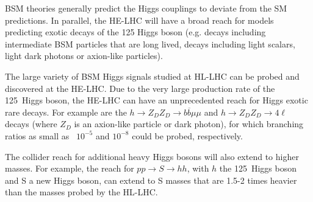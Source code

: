 \documentclass[../report.tex]{subfiles}
\begin{document}
BSM theories generally predict the Higgs couplings to deviate from the SM predictions. In parallel, the HE-LHC will have a broad reach for models predicting exotic decays of the 125 \UGeV Higgs boson (e.g. decays including intermediate BSM particles that are long lived, decays including light scalars, light dark photons or axion-like particles). 

The large variety of BSM Higgs signals studied at HL-LHC can be probed and discovered at the HE-LHC. Due to the very large production rate of the 125~\UGeV Higgs boson, the HE-LHC can have an unprecedented reach for Higgs exotic rare decays. For example are the $h \rightarrow Z_D Z_D \rightarrow b\overline{b}\mu\mu$ and $h \rightarrow  Z_D Z_D \rightarrow 4\ell$ decays (where $Z_D$ is an axion-like particle or dark photon), for which branching ratios as small as ~$10^{-5}$ and $10^{-8}$ could be probed, respectively.

The collider reach for additional heavy Higgs bosons will also extend to higher masses. For example, the reach for $pp \rightarrow S \rightarrow hh$, with $h$ the 125~\UGeV Higgs boson and S a new Higgs boson, can extend to S masses that are 1.5-2 times heavier than the masses probed by the HL-LHC.
\end{document}
